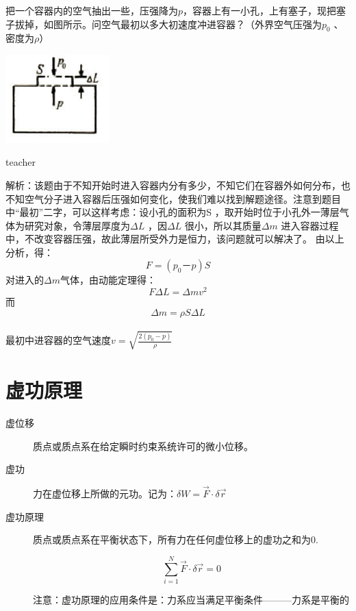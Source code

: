 \begin{example}
	把一个容器内的空气抽出一些，压强降为$p$，容器上有一小孔，上有塞子，现把塞子拔掉，如图所示。问空气最初以多大初速度冲进容器？（外界空气压强为$p_0$ 、密度为$\rho$）
\begin{flushright}
\includegraphics[width = 0.3\textwidth]{images/smallAna-3.pdf} 
\end{flushright}
\begin{taggedblock}{teacher}

解析：该题由于不知开始时进入容器内分有多少，不知它们在容器外如何分布，也不知空气分子进入容器后压强如何变化，使我们难以找到解题途径。注意到题目中“最初”二字，可以这样考虑：设小孔的面积为S ，取开始时位于小孔外一薄层气体为研究对象，令薄层厚度为$\Delta L$ ，因$\Delta L$ 很小，所以其质量$\Delta m$ 进入容器过程中，不改变容器压强，故此薄层所受外力是恒力，该问题就可以解决了。
由以上分析，得：\[F = (p_0－p)S\]            
对进入的$\Delta m$气体，由动能定理得：\[F \Delta L = \Delta mv^2\]     
而 \[\Delta m = \rho S\Delta L\]                                     
\\最初中进容器的空气速度$v=\sqrt{\frac{2(p_0-p)}{\rho}}$
\end{taggedblock}
\end{example}


\section{虚功原理}
\begin{description}
\item[虚位移]
质点或质点系在给定瞬时约束系统许可的微小位移。
\item[虚功]
力在虚位移上所做的元功。记为：$\delta W=\vec{F}\cdot\delta\vec{r}$
\item[虚功原理]
质点或质点系在平衡状态下，所有力在任何虚位移上的虚功之和为0.

\begin{equation}
\sum_{i=1}^{N}\vec{F}\cdot\delta\vec{r}=0
\end{equation}


	注意：虚功原理的应用条件是：力系应当满足平衡条件———力系是平衡的
\end{description}

